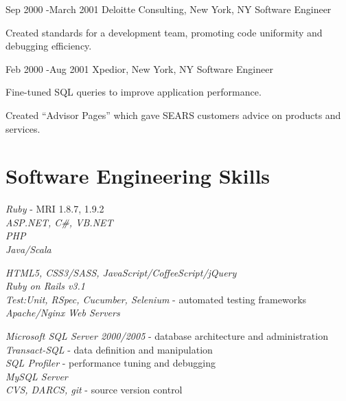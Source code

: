 \documentclass[10pt]{article} %
\begin{document}

\job
{Sep 2000 -}{March 2001}
{Deloitte Consulting, New York, NY}
{}
{Software Engineer}
{
\begin{itemize-noindent}
\item{Created standards for a development team, promoting code uniformity and debugging efficiency.}
\end{itemize-noindent}
}


\job
{Feb 2000 -}{Aug 2001}
{Xpedior, New York, NY}
{}
{Software Engineer}
{
\begin{itemize-noindent}
\item{Fine-tuned SQL queries to improve application performance.}
\item{Created “Advisor Pages” which gave SEARS customers advice on products and services.}
\end{itemize-noindent}
}




\section{Software Engineering Skills}

{
\textit{Ruby} - MRI 1.8.7, 1.9.2\\
\textit{ASP.NET, C\#, VB.NET}\\
\textit{PHP}\\
\textit{Java/Scala}
}


{
\textit{HTML5, CSS3/SASS, JavaScript/CoffeeScript/jQuery}\\
\textit{Ruby on Rails v3.1}\\
\textit{Test:Unit, RSpec, Cucumber, Selenium} - automated testing frameworks\\
\textit{Apache/Nginx Web Servers}\\
}


{
\textit{Microsoft SQL Server 2000/2005} - database architecture and administration\\
\textit{Transact-SQL} - data definition and manipulation\\
\textit{SQL Profiler} - performance tuning and debugging\\
\textit{MySQL Server}\\
\textit{CVS, DARCS, git} - source version control
}
\end{document}
